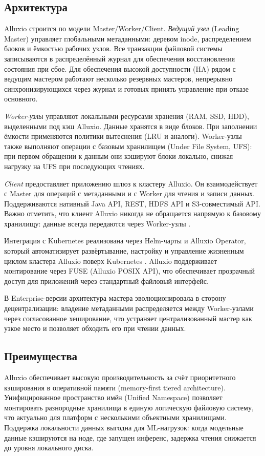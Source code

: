 \subsection*{Архитектура}

Alluxio строится по модели Master/Worker/Client. \textit{Ведущий узел} (Leading Master) управляет глобальными метаданными: деревом inode, распределением блоков и ёмкостью рабочих узлов. Все транзакции файловой системы записываются в распределённый журнал для обеспечения восстановления состояния при сбое. Для обеспечения высокой доступности (HA) рядом с ведущим мастером работают несколько резервных мастеров, непрерывно синхронизирующихся через журнал и готовых принять управление при отказе основного.

\textit{Worker-узлы} управляют локальными ресурсами хранения (RAM, SSD, HDD), выделенными под кэш Alluxio. Данные хранятся в виде блоков. При заполнении ёмкости применяются политики вытеснения (LRU и аналоги). Worker-узлы также выполняют операции с базовым хранилищем (Under File System, UFS): при первом обращении к данным они кэшируют блоки локально, снижая нагрузку на UFS при последующих чтениях.

\textit{Client} предоставляет приложению шлюз к кластеру Alluxio. Он взаимодействует с Master для операций с метаданными и с Worker для чтения и записи данных. Поддерживаются нативный Java API, REST, HDFS API и S3-совместимый API. Важно отметить, что клиент Alluxio никогда не обращается напрямую к базовому хранилищу: данные всегда передаются через Worker-узлы \cite{alluxio_arch}.

Интеграция с Kubernetes реализована через Helm-чарты и Alluxio Operator, который автоматизирует развёртывание, настройку и управление жизненным циклом кластера Alluxio поверх Kubernetes \cite{alluxio_k8s}. Alluxio поддерживает монтирование через FUSE (Alluxio POSIX API), что обеспечивает прозрачный доступ для приложений через стандартный файловый интерфейс.

В Enterprise-версии архитектура мастера эволюционировала в сторону децентрализации: владение метаданными распределяется между Worker-узлами через согласованное хеширование, что устраняет централизованный мастер как узкое место и позволяет обходить его при чтении данных.

\subsection*{Преимущества}

Alluxio обеспечивает высокую производительность за счёт приоритетного кэширования в оперативной памяти (memory-first tiered architecture). Унифицированное пространство имён (Unified Namespace) позволяет монтировать разнородные хранилища в единую логическую файловую систему, что актуально для платформ с несколькими объектными хранилищами. Поддержка локальности данных выгодна для ML-нагрузок: когда модельные данные кэшируются на ноде, где запущен инференс, задержка чтения снижается до уровня локального диска.

